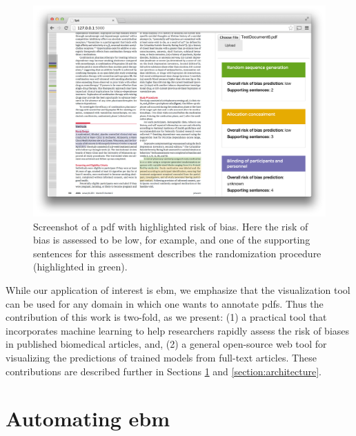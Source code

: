 \documentclass[runningheads,a4paper]{llncs}
\begin{document}
\begin{figure}[htb]
\vspace{-1em}
\centering
\includegraphics[width=0.8\linewidth]{./images/screenshot2.png}
\vspace{-1em}
\caption{\label{fig:screenshot}Screenshot of a \ac{pdf} with highlighted risk of bias. Here the risk of bias is assessed to be low, for example, and one of the supporting sentences for this assessment describes the randomization procedure (highlighted in green).}
\vspace{-1em}
\end{figure}

While our application of interest is \ac{ebm}, we emphasize that the visualization tool can be used for any domain in which one wants to annotate \acp{pdf}.
Thus the contribution of this work is two-fold, as we present:
(1) a practical tool that incorporates machine learning to help researchers rapidly assess the risk of biases in published biomedical articles, and,
(2) a general open-source web tool for visualizing the predictions of trained models from full-text articles.
These contributions are described further in Sections \ref{section:EBM-ML} and \ref{section:architecture}.

\section{Automating \acl{ebm}}
\label{section:EBM-ML}
\end{document}
